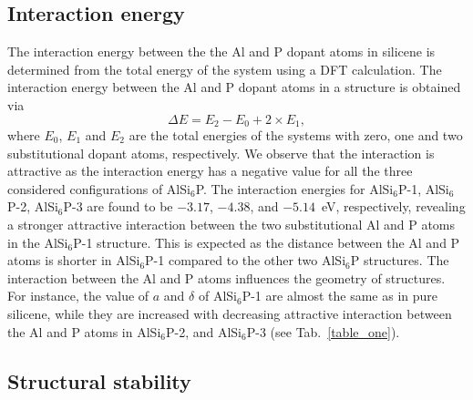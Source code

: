 \documentclass[5p,twocolumn]{elsarticle}
\def\tab#1{Tab.\ \ref{#1}}
\begin{document}
\subsection{Interaction energy}

The interaction energy between the the Al and P dopant atoms in
silicene is determined from the total energy of the system using a DFT calculation. 
The interaction energy between the Al and P dopant atoms in a structure is obtained via \cite{ABDULLAH2020100740}
%
\begin{equation}
	\Delta E = E_2 - E_0 + 2 \times E_1,
\end{equation}
%
where $E_0$, $E_1$ and $E_2$ are the total energies of the systems with zero, one
and two substitutional dopant atoms, respectively. We observe that the interaction is attractive as the interaction energy has a negative value for all the three considered configurations of AlSi$_6$P.
The interaction energies for AlSi$_6$P-1, AlSi$_6$P-2, AlSi$_6$P-3 are found to be $-3.17$, $-4.38$, and $-5.14$~eV, respectively, revealing a stronger attractive interaction between the two substitutional Al and P atoms in the AlSi$_6$P-1 structure. This is expected as the distance between the Al and P atoms is shorter in AlSi$_6$P-1 compared to the other two AlSi$_6$P structures.
The interaction between the Al and P atoms influences the geometry of structures. For instance, the value of $a$ and $\delta$ of AlSi$_6$P-1 are almost the same as in pure silicene, while they are increased with decreasing attractive interaction between the Al and P atoms in AlSi$_6$P-2, and AlSi$_6$P-3 (see \tab{table_one}).


\subsection{Structural stability}
\end{document}
